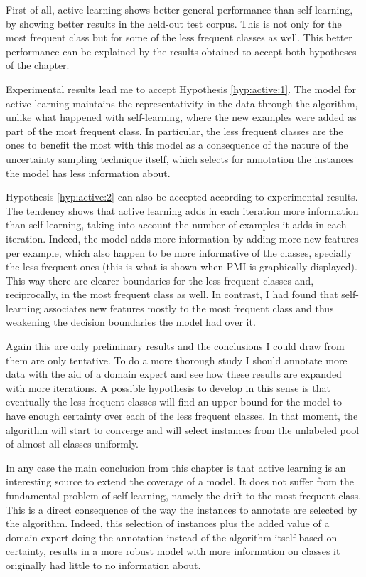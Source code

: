 First of all, active learning shows better general performance than
self-learning, by showing better results in the held-out test corpus. This is
not only for the most frequent class but for some of the less frequent classes
as well. This better performance can be explained by the results obtained to
accept both hypotheses of the chapter.

Experimental results lead me to accept Hypothesis \ref{hyp:active:1}. The model
for active learning maintains the representativity in the data through the
algorithm, unlike what happened with self-learning, where the new examples were
added as part of the most frequent class. In particular, the less frequent
classes are the ones to benefit the most with this model as a consequence of
the nature of the uncertainty sampling technique itself, which selects for
annotation the instances the model has less information about.

Hypothesis \ref{hyp:active:2} can also be accepted according to experimental
results. The tendency shows that active learning adds in each iteration more
information than self-learning, taking into account the number of examples it
adds in each iteration. Indeed, the model adds more information by adding more
new features per example, which also happen to be more informative of the
classes, specially the less frequent ones (this is what is shown when PMI is
graphically displayed). This way there are clearer boundaries for the less
frequent classes and, reciprocally, in the most frequent class as well. In
contrast, I had found that self-learning associates new features mostly to the
most frequent class and thus weakening the decision boundaries the model had
over it.

Again this are only preliminary results and the conclusions I could draw from
them are only tentative. To do a more thorough study I should annotate more
data with the aid of a domain expert and see how these results are expanded
with more iterations. A possible hypothesis to develop in this sense is that
eventually the less frequent classes will find an upper bound for the model to
have enough certainty over each of the less frequent classes. In that moment,
the algorithm will start to converge and will select instances from the
unlabeled pool of almost all classes uniformly.

In any case the main conclusion from this chapter is that active learning is an
interesting source to extend the coverage of a model. It does not suffer from
the fundamental problem of self-learning, namely the drift to the most frequent
class. This is a direct consequence of the way the instances to annotate are
selected by the algorithm. Indeed, this selection of instances plus the added
value of a domain expert doing the annotation instead of the algorithm itself
based on certainty, results in a more robust model with more information on
classes it originally had little to no information about.

